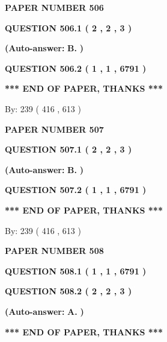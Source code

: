 \documentclass[12pt]{article}
\begin{document}
   
 {\textbf{ \Large{ PAPER NUMBER  506  }}}
   
   
   
   
  
  
{\textbf{\large{QUESTION
506.1 
 ( 2 , 2 , 3 )
}}}
 
 
{\textbf{(Auto-answer:}}
{\textbf{\large{
B.}}}
{\textbf{)}}
 
 
  
  
{\textbf{\large{QUESTION
506.2 
 ( 1 , 1 , 6791 )
}}}
   
   
   
   
\vspace{1.0in} 
{\textbf{\large{ *** END OF PAPER, THANKS *** }}} 
   
   
\hspace{1.0in} By: 
 239 ( 416 ,  613 )
   
   
   
   
\newpage 
\setcounter{page}{ 
   507001 } 
   
   
 {\textbf{ \Large{ PAPER NUMBER  507  }}}
   
   
   
   
  
  
{\textbf{\large{QUESTION
507.1 
 ( 2 , 2 , 3 )
}}}
 
 
{\textbf{(Auto-answer:}}
{\textbf{\large{
B.}}}
{\textbf{)}}
 
 
  
  
{\textbf{\large{QUESTION
507.2 
 ( 1 , 1 , 6791 )
}}}
   
   
   
   
\vspace{1.0in} 
{\textbf{\large{ *** END OF PAPER, THANKS *** }}} 
   
   
\hspace{1.0in} By: 
 239 ( 416 ,  613 )
   
   
   
   
\newpage 
\setcounter{page}{ 
   508001 } 
   
   
 {\textbf{ \Large{ PAPER NUMBER  508  }}}
   
   
   
   
  
  
{\textbf{\large{QUESTION
508.1 
 ( 1 , 1 , 6791 )
}}}
  
  
{\textbf{\large{QUESTION
508.2 
 ( 2 , 2 , 3 )
}}}
 
 
{\textbf{(Auto-answer:}}
{\textbf{\large{
A.}}}
{\textbf{)}}
 
 
   
   
   
   
\vspace{1.0in} 
{\textbf{\large{ *** END OF PAPER, THANKS *** }}} 
   
\end{document}
